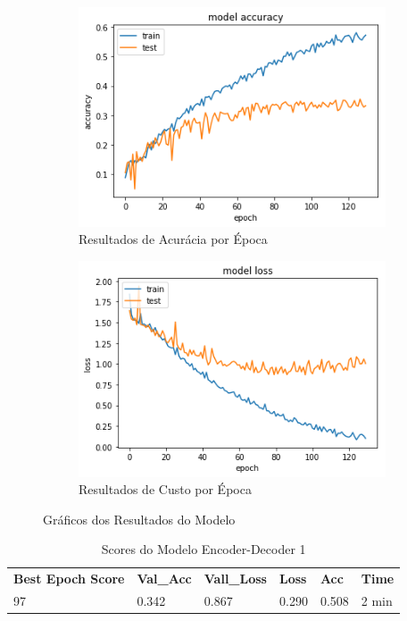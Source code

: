 \begin{figure}[h]
  \centering
  \begin{subfigure}[b]{0.45\linewidth}
    \includegraphics[width=\linewidth]{img/enc-dec-1.png}
    \caption{Resultados de Acurácia por Época}
  \end{subfigure}
  \begin{subfigure}[b]{0.45\linewidth}
    \includegraphics[width=\linewidth]{img/enc-dec-1-loss.png}
    \caption{Resultados de Custo por Época}
  \end{subfigure}
  \caption{Gráficos dos Resultados do Modelo}
  \label{fig:plots1}
\end{figure}

\begin{table}[h]
\centering
\begin{tabular}{llllll}
\textbf{Best Epoch Score} & \textbf{Val\_Acc} & \textbf{Vall\_Loss} & \textbf{Loss} & \textbf{Acc} & \textbf{Time} \\
97 & 0.342 & 0.867 & 0.290 & 0.508 & 2 min
\end{tabular}
\caption{Scores do Modelo Encoder-Decoder 1}
\label{tab:res-enc-dec-1}
\end{table}

